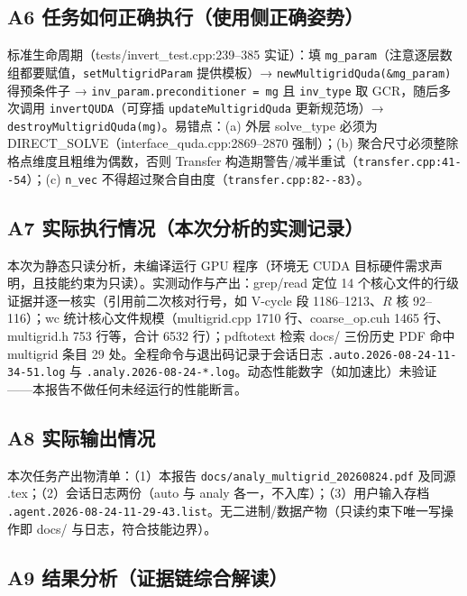 \documentclass[UTF8]{ctexart}
\begin{document}
\subsection{A6 任务如何正确执行（使用侧正确姿势）}

标准生命周期（tests/invert\_test.cpp:239--385 实证）：填 \texttt{mg\_param}（注意逐层数组都要赋值，\texttt{setMultigridParam} 提供模板）→ \texttt{newMultigridQuda(\&mg\_param)} 得预条件子 → \texttt{inv\_param.preconditioner = mg} 且 \texttt{inv\_type} 取 GCR，随后多次调用 \texttt{invertQUDA}（可穿插 \texttt{updateMultigridQuda} 更新规范场）→ \texttt{destroyMultigridQuda(mg)}。易错点：(a) 外层 solve\_type 必须为 DIRECT\_SOLVE（interface\_quda.cpp:2869--2870 强制）；(b) 聚合尺寸必须整除格点维度且粗维为偶数，否则 Transfer 构造期警告/减半重试（\textcolor{evidence}{\texttt{\nolinkurl{transfer.cpp:41--54}}}）；(c) \texttt{n\_vec} 不得超过聚合自由度（\textcolor{evidence}{\texttt{\nolinkurl{transfer.cpp:82--83}}}）。

\subsection{A7 实际执行情况（本次分析的实测记录）}

本次为静态只读分析，未编译运行 GPU 程序（环境无 CUDA 目标硬件需求声明，且技能约束为只读）。实测动作与产出：grep/read 定位 14 个核心文件的行级证据并逐一核实（引用前二次核对行号，如 V-cycle 段 1186--1213、$R$ 核 92--116）；wc 统计核心文件规模（multigrid.cpp 1710 行、coarse\_op.cuh 1465 行、multigrid.h 753 行等，合计 6532 行）；pdftotext 检索 docs/ 三份历史 PDF 命中 multigrid 条目 29 处。全程命令与退出码记录于会话日志 \texttt{\nolinkurl{.auto.2026-08-24-11-34-51.log}} 与 \texttt{\nolinkurl{.analy.2026-08-24-*.log}}。动态性能数字（如加速比）\textcolor{warn}{未验证}——本报告不做任何未经运行的性能断言。

\subsection{A8 实际输出情况}

本次任务产出物清单：（1）本报告 \texttt{\nolinkurl{docs/analy_multigrid_20260824.pdf}} 及同源 .tex；（2）会话日志两份（auto 与 analy 各一，不入库）；（3）用户输入存档 \texttt{\nolinkurl{.agent.2026-08-24-11-29-43.list}}。无二进制/数据产物（只读约束下唯一写操作即 docs/ 与日志，符合技能边界）。

\subsection{A9 结果分析（证据链综合解读）}
\end{document}
